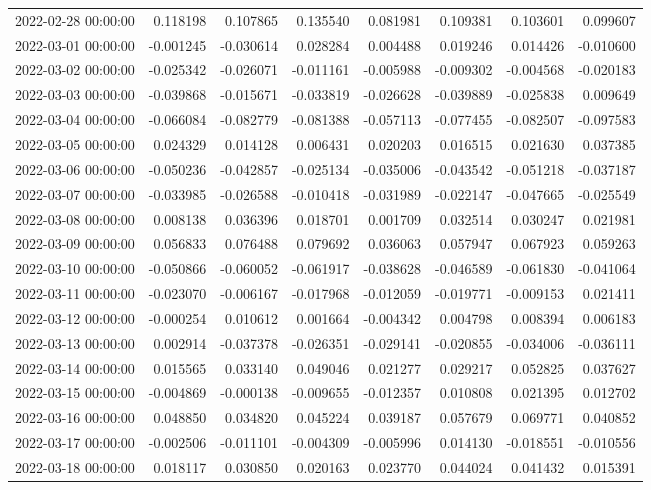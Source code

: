 \begin{tabular}{lrrrrrrr}
2022-02-28 00:00:00 & 0.118198 & 0.107865 & 0.135540 & 0.081981 & 0.109381 & 0.103601 & 0.099607 \\
2022-03-01 00:00:00 & -0.001245 & -0.030614 & 0.028284 & 0.004488 & 0.019246 & 0.014426 & -0.010600 \\
2022-03-02 00:00:00 & -0.025342 & -0.026071 & -0.011161 & -0.005988 & -0.009302 & -0.004568 & -0.020183 \\
2022-03-03 00:00:00 & -0.039868 & -0.015671 & -0.033819 & -0.026628 & -0.039889 & -0.025838 & 0.009649 \\
2022-03-04 00:00:00 & -0.066084 & -0.082779 & -0.081388 & -0.057113 & -0.077455 & -0.082507 & -0.097583 \\
2022-03-05 00:00:00 & 0.024329 & 0.014128 & 0.006431 & 0.020203 & 0.016515 & 0.021630 & 0.037385 \\
2022-03-06 00:00:00 & -0.050236 & -0.042857 & -0.025134 & -0.035006 & -0.043542 & -0.051218 & -0.037187 \\
2022-03-07 00:00:00 & -0.033985 & -0.026588 & -0.010418 & -0.031989 & -0.022147 & -0.047665 & -0.025549 \\
2022-03-08 00:00:00 & 0.008138 & 0.036396 & 0.018701 & 0.001709 & 0.032514 & 0.030247 & 0.021981 \\
2022-03-09 00:00:00 & 0.056833 & 0.076488 & 0.079692 & 0.036063 & 0.057947 & 0.067923 & 0.059263 \\
2022-03-10 00:00:00 & -0.050866 & -0.060052 & -0.061917 & -0.038628 & -0.046589 & -0.061830 & -0.041064 \\
2022-03-11 00:00:00 & -0.023070 & -0.006167 & -0.017968 & -0.012059 & -0.019771 & -0.009153 & 0.021411 \\
2022-03-12 00:00:00 & -0.000254 & 0.010612 & 0.001664 & -0.004342 & 0.004798 & 0.008394 & 0.006183 \\
2022-03-13 00:00:00 & 0.002914 & -0.037378 & -0.026351 & -0.029141 & -0.020855 & -0.034006 & -0.036111 \\
2022-03-14 00:00:00 & 0.015565 & 0.033140 & 0.049046 & 0.021277 & 0.029217 & 0.052825 & 0.037627 \\
2022-03-15 00:00:00 & -0.004869 & -0.000138 & -0.009655 & -0.012357 & 0.010808 & 0.021395 & 0.012702 \\
2022-03-16 00:00:00 & 0.048850 & 0.034820 & 0.045224 & 0.039187 & 0.057679 & 0.069771 & 0.040852 \\
2022-03-17 00:00:00 & -0.002506 & -0.011101 & -0.004309 & -0.005996 & 0.014130 & -0.018551 & -0.010556 \\
2022-03-18 00:00:00 & 0.018117 & 0.030850 & 0.020163 & 0.023770 & 0.044024 & 0.041432 & 0.015391 \\

\end{tabular}
